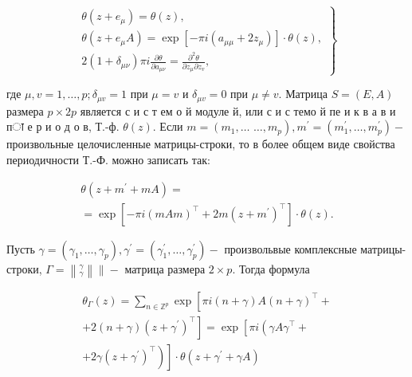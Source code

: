 \documentclass[10pt]{article}
\begin{document}
\[

\left.\begin{array}{l}

\theta\left(z+e_{\mu}\right)=\theta(z), \\

\theta\left(z+e_{\mu} A\right)=\exp \left[-\pi i\left(a_{\mu \mu}+2 z_{\mu}\right)\right] \cdot \theta(z), \\

2\left(1+\delta_{\mu \nu}\right) \pi i \frac{\partial \theta}{\partial a_{\mu \nu}}=\frac{\partial^{2} \theta}{\partial z_{\mu} \partial z_{v}},

\end{array}\right\}

\]



где $\mu, v=1, \ldots, p ; \delta_{\mu v}=1$ при $\mu=v$ и $\delta_{\mu v}=0$ при $\mu \neq v$. Матрица $S=(E, A)$ размера $p \times 2 p$ является с и с т ем о й модуле й, или с и с темо й пе и к в а в и пा е р и о д о в, Т.-ф. $\theta(z)$. Если $m=\left(m_{1}, \ldots\right.$ $\left.\ldots, m_{p}\right), m^{\prime}=\left(m_{1}^{\prime}, \ldots, m_{p}^{\prime}\right)-$ произвольные целочисленные матрицы-строки, то в более общем виде свойства периодичности Т.-Ф. можно записать так:



\[

\begin{gathered}

\theta\left(z+m^{\prime}+m A\right)= \\

=\exp \left[-\pi i(m A m)^{\top}+2 m\left(z+m^{\prime}\right)^{\top}\right] \cdot \theta(z) .

\end{gathered}

\]



Пусть $\gamma=\left(\gamma_{1}, \ldots, \gamma_{p}\right), \gamma^{\prime}=\left(\gamma_{1}^{\prime}, \ldots, \gamma_{p}^{\prime}\right)-$ произвольвые комплексные матрицы-строки, $\Gamma=\left\|_{\gamma}^{\gamma}\right\| \|-$ матрица размера $2 \times p$. Тогда формула



\[

\begin{gathered}

\theta_{\Gamma}(z)=\sum_{n \in \mathbb{Z}^{p}} \exp \left[\pi i(n+\gamma) A(n+\gamma)^{\top}+\right. \\

\left.+2(n+\gamma)\left(z+\gamma^{\prime}\right)^{\top}\right]=\exp \left[\pi i \left(\gamma A \gamma^{\top}+\right.\right. \\

\left.\left.+2 \gamma\left(z+\gamma^{\prime}\right)^{\top}\right)\right] \cdot \theta\left(z+\gamma^{\prime}+\gamma A\right)

\end{gathered}

\]
\end{document}
